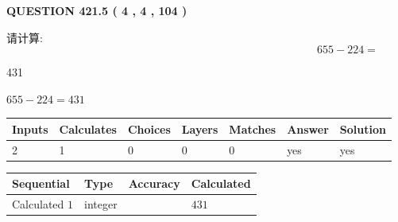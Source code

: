 \documentclass{ctexart}
\begin{document}
   
  
\vspace{0.2in}
  
{\textbf{\Large{QUESTION
421.5 
 ( 4 , 4 , 104 )
}}}
  
  
 
请计算:
\begin{equation}
655 -   %
224 = \nonumber
\end{equation}
 
 
 
\noindent{}
 
 

431
 
 
\noindent{}
 
 

 
 
 
\noindent{}
 
 

$ %
655 -  %
224=   %
431$
 
 
\noindent{}
 
 

 
   
   
   
   
\noindent\begin{tabular}{|l|l|l|l|l|l|l|}
 \hline
Inputs & Calculates & Choices & Layers & Matches & Answer & Solution \\ \hline
 2  & 
 1  & 
 0
  & 
 0  & 
 0  & 
  yes & 
  yes 
  \\ \hline
 \end{tabular}
   
   
   
   
\noindent{}
   
   
  
  
\noindent\begin{tabular}{|l|l|l|l|}
\hline
 Sequential & Type & Accuracy & Calculated \\ 
\hline
 
 
  Calculated $  1 $ & integer &  & 
  $ 431 $ 
 \\  \hline  
 \end{tabular}
   
\end{document}
